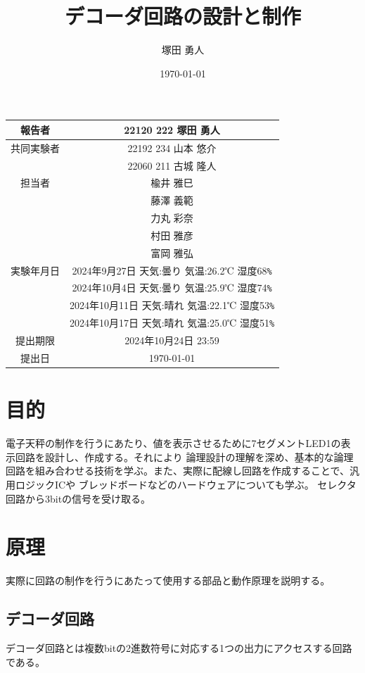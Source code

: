 \documentclass[a4paper,11pt,dvipdfmx]{jsarticle}
\begin{document}
\begin{table}[b]
  \centering
  \begin{tabular}{|c|c|}
    \hline
    報告者     & 22120 222 塚田 勇人 \\
    \hline
    共同実験者 & 22192 234 山本 悠介  \\ & 22060 211 古城 隆人\\
    \hline
    担当者     & 楡井 雅巳 \\
              &  藤澤 義範\\
    &力丸 彩奈\\
    &村田 雅彦\\
    &富岡 雅弘\\
    \hline
    実験年月日 & 2024年9月27日 天気:曇り 気温:26.2℃ 湿度68\verb#%#\\
    & 2024年10月4日 天気:曇り 気温:25.9℃ 湿度74\verb#%#\\
    & 2024年10月11日 天気:晴れ 気温:22.1℃ 湿度53\verb#%#\\
    & 2024年10月17日 天気:晴れ 気温:25.0℃ 湿度51\verb#%#\\
    \hline
    提出期限   & 2024年10月24日 23:59  \\
    \hline
    提出日     & \today              \\
    \hline
  \end{tabular}
\end{table}


\title{デコーダ回路の設計と制作}
\author{塚田 勇人}
\date{\today}
\maketitle

\newpage
\section{目的}
電子天秤の制作を行うにあたり、値を表示させるために7セグメントLED1の表示回路を設計し、作成する。それにより
論理設計の理解を深め、基本的な論理回路を組み合わせる技術を学ぶ。また、実際に配線し回路を作成することで、汎用ロジックICや
ブレッドボードなどのハードウェアについても学ぶ。
セレクタ回路から3bitの信号を受け取る。
\section{原理}
実際に回路の制作を行うにあたって使用する部品と動作原理を説明する。
\subsection{デコーダ回路}
デコーダ回路とは複数bitの2進数符号に対応する1つの出力にアクセスする回路である\cite{Khokasho}。
\end{document}
